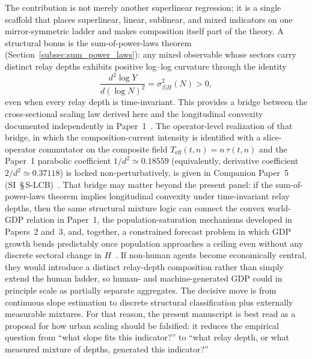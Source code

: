 The contribution is not merely another superlinear regression; it is a single scaffold that places superlinear, linear, sublinear, and mixed
indicators on one mirror-symmetric ladder and makes composition itself part of
the theory.
A structural bonus is the sum-of-power-laws theorem
(Section~\ref{subsec:sum_power_laws}): any mixed observable whose sectors
carry distinct relay depths exhibits positive log--log
curvature through the identity
\[
\frac{d^2 \log Y}{d(\log N)^2}=\sigma^2_{\beta|H}(N)>0,
\]
even when every relay depth is time-invariant. This provides a bridge between the
cross-sectional scaling law derived here and the longitudinal convexity documented
independently in Paper~1~\cite{Kato2026a}. The operator-level realization of that
bridge, in which the composition-current intensity is identified with a
slice-operator commutator on the composite field
$T_{\mathrm{eff}}(t,n)=n\,\tau(t,n)$ and the Paper~1 parabolic coefficient
$1/d^{2}\simeq 0.18559$ (equivalently, derivative coefficient $2/d^{2}\simeq 0.37118$) is locked non-perturbatively, is given in Companion
Paper~5 (SI~\S\,S-LCB)~\cite{Kato2026e}.
That bridge may matter beyond the present panel: if the sum-of-power-laws theorem implies longitudinal convexity under time-invariant relay depths, then the same structural mixture logic can connect the convex world-GDP relation in Paper~1, the population-saturation mechanisms developed in Papers~2 and~3, and, together, a constrained forecast problem in which GDP growth bends predictably once population approaches a ceiling even without any discrete sectoral change in \(H\)~\cite{Kato2026a,Kato2026b,Kato2026c}.
If non-human agents become economically central, they would introduce a distinct relay-depth composition rather than simply extend the human ladder, so human- and machine-generated GDP could in principle scale as partially separate aggregates.
The decisive move is from continuous slope estimation to discrete structural
classification plus externally measurable mixtures.
For that reason, the present manuscript is best read as a proposal for how
urban scaling should be falsified:
it reduces the empirical question from ``what slope fits this indicator?'' to
``what relay depth, or what measured mixture of depths, generated this
indicator?''

